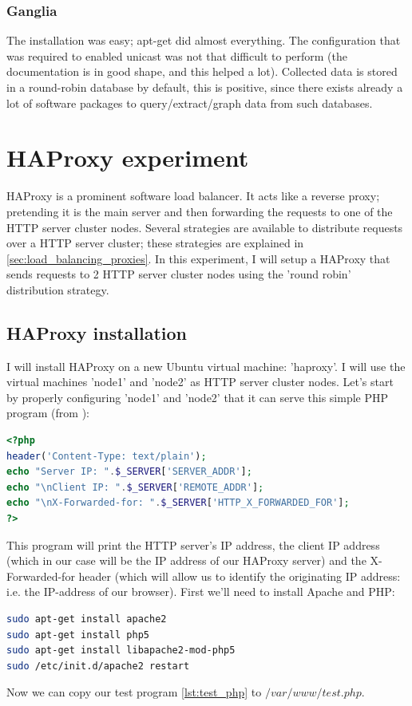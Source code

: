 \documentclass[12pt]{report}
\begin{document}
\subsubsection{Ganglia}
The installation was easy; apt-get did almost everything. The
configuration that was required to enabled unicast was not that
difficult to perform (the documentation is in good shape, and this helped a lot).
Collected data is stored in a round-robin database by default, this is
positive, since there exists already a lot of software packages
to query/extract/graph data from such databases.

\section{HAProxy experiment}
\label{ha_proxy_experiment}
HAProxy is a prominent software load balancer. It acts like a reverse
proxy; pretending it is the main server and then forwarding the
requests to one of the HTTP server cluster nodes.
Several strategies are available to distribute requests over a HTTP
server cluster; these strategies are explained in
\ref{sec:load_balancing_proxies}.
In this experiment, I will setup a HAProxy that sends requests to 2
HTTP server cluster nodes using the 'round robin' distribution
strategy.
\subsection{HAProxy installation}
I will install HAProxy on a new Ubuntu virtual machine: 'haproxy'.
I will use the virtual machines 'node1' and 'node2' as HTTP server cluster nodes.
Let's start by properly configuring 'node1' and 'node2' that it can
serve this simple PHP program (from \cite{haproxy_install_tutorial}):
\label{lst:test_php}
\begin{lstlisting}[language=php]
<?php
header('Content-Type: text/plain');
echo "Server IP: ".$_SERVER['SERVER_ADDR'];
echo "\nClient IP: ".$_SERVER['REMOTE_ADDR'];
echo "\nX-Forwarded-for: ".$_SERVER['HTTP_X_FORWARDED_FOR'];
?>
\end{lstlisting} 
This program will print the HTTP server's IP address, the client IP
address (which in our case will be the IP address of our HAProxy
server) and the X-Forwarded-for header (which will allow us to identify
the originating IP address: i.e. the IP-address of our browser).
First we'll need to install Apache and PHP:
\begin{lstlisting}[language=bash]
sudo apt-get install apache2
sudo apt-get install php5
sudo apt-get install libapache2-mod-php5
sudo /etc/init.d/apache2 restart
\end{lstlisting} 
Now we can copy our test program \ref{lst:test_php} to
$/var/www/test.php$.
\end{document}
